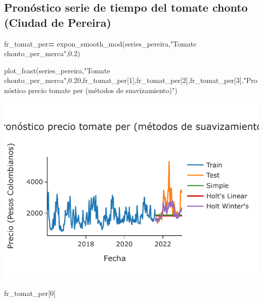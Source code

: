 \documentclass[
]{book}
\newenvironment{Shaded}{\begin{snugshade}}{\end{snugshade}}
\newcommand{\DecValTok}[1]{\textcolor[rgb]{0.00,0.00,0.81}{#1}}
\newcommand{\FloatTok}[1]{\textcolor[rgb]{0.00,0.00,0.81}{#1}}
\newcommand{\NormalTok}[1]{#1}
\newcommand{\OperatorTok}[1]{\textcolor[rgb]{0.81,0.36,0.00}{\textbf{#1}}}
\newcommand{\StringTok}[1]{\textcolor[rgb]{0.31,0.60,0.02}{#1}}
\begin{document}
\hypertarget{pronuxf3stico-serie-de-tiempo-del-tomate-chonto-ciudad-de-pereira}{%
\subsection{Pronóstico serie de tiempo del tomate chonto (Ciudad de Pereira)}\label{pronuxf3stico-serie-de-tiempo-del-tomate-chonto-ciudad-de-pereira}}

\begin{Shaded}
\begin{Highlighting}[]

\NormalTok{fr\_tomat\_per}\OperatorTok{=}\NormalTok{ expon\_smooth\_mod(series\_pereira,}\StringTok{"Tomate chonto\_per\_merca"}\NormalTok{,}\FloatTok{0.2}\NormalTok{)}

\NormalTok{plot\_fcast(series\_pereira,}\StringTok{"Tomate chonto\_per\_merca"}\NormalTok{,}\FloatTok{0.20}\NormalTok{,fr\_tomat\_per[}\DecValTok{1}\NormalTok{],fr\_tomat\_per[}\DecValTok{2}\NormalTok{],fr\_tomat\_per[}\DecValTok{3}\NormalTok{],}\StringTok{"Pronóstico precio tomate per (métodos de suavizamiento)"}\NormalTok{)}
\end{Highlighting}
\end{Shaded}

\includegraphics{bookdown-demo_files/figure-latex/unnamed-chunk-146-133.pdf}

\begin{Shaded}
\begin{Highlighting}[]

\NormalTok{fr\_tomat\_per[}\DecValTok{0}\NormalTok{]}
\end{Highlighting}
\end{Shaded}
\end{document}
